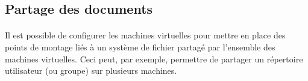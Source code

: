 \subsection{Partage des documents}

\paragraph{} Il est possible de configurer les machines virtuelles pour mettre
en place des points de montage liés à un système de fichier partagé par
l'ensemble des machines virtuelles. Ceci peut, par exemple, permettre de
partager un répertoire utilisateur (ou groupe) sur plusieurs machines.
